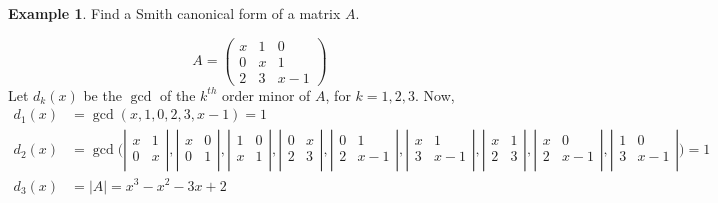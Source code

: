 \documentclass{article}
\theoremstyle{definition}
\newtheorem{exmp}[thm]{Example}
\theoremstyle{remark}
\begin{document}
\begin{exmp}
Find a Smith canonical form of a matrix $A$.

$$
  A= \left(
    \begin{matrix}
      x & 1 & 0 \\
      0 & x & 1 \\
      2 & 3 & x-1
    \end{matrix}
    \right)
$$
Let $d_k(x)$ be the $\gcd$ of the $k^{th}$ order minor of $A$, for $k=1,2,3$. Now,
\begin{align*}
d_1(x) &=\gcd(x,1,0,2,3,x-1)=1\\
d_2(x) &=\gcd\biggl( \left|
    \begin{matrix}
      x & 1  \\
      0 & x  \\
    \end{matrix}
    \right|,
    \left|
    \begin{matrix}
      x & 0  \\
      0 & 1  \\
    \end{matrix}
    \right|,
    \left|
    \begin{matrix}
      1 & 0  \\
      x & 1  \\
    \end{matrix}
    \right|,
    \left|
    \begin{matrix}
      0 & x  \\
      2 & 3  \\
    \end{matrix}
    \right|,
    \left|
    \begin{matrix}
      0 & 1  \\
      2 & x-1  \\
    \end{matrix}
    \right|,
    \left|
    \begin{matrix}
      x & 1  \\
      3 & x-1  \\
    \end{matrix}
    \right|,
    \left|
    \begin{matrix}
      x & 1  \\
      2 & 3  \\
    \end{matrix}
    \right|,
    \left|
    \begin{matrix}
      x & 0  \\
      2 & x-1  \\
    \end{matrix}
    \right|,
    \left|
    \begin{matrix}
      1 & 0  \\
      3 & x-1  \\
    \end{matrix}
    \right|
     \biggl)=1\\
d_3(x)&=|A|=x^3-x^2-3x+2
\end{align*}


\end{exmp}
\end{document}
